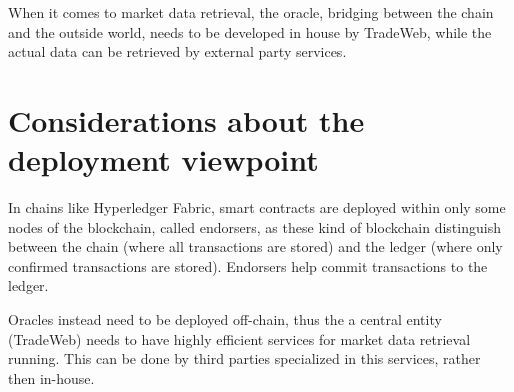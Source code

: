 \documentclass{article}
\begin{document}
When it comes to market data retrieval, the oracle, bridging between the chain and the outside world, needs to be developed in house by TradeWeb, while the actual data can be retrieved by external party services.

\section{Considerations about the deployment viewpoint}
In chains like Hyperledger Fabric, smart contracts are deployed within only some nodes of the blockchain, called endorsers, as these kind of blockchain distinguish between the chain (where all transactions are stored) and the ledger (where only confirmed transactions are stored).
Endorsers help commit transactions to the ledger.

Oracles instead need to be deployed off-chain, thus the a central entity (TradeWeb) needs to have highly efficient services for market data retrieval running. This can be done by third parties specialized in this services, rather then in-house.
 
\end{document}
